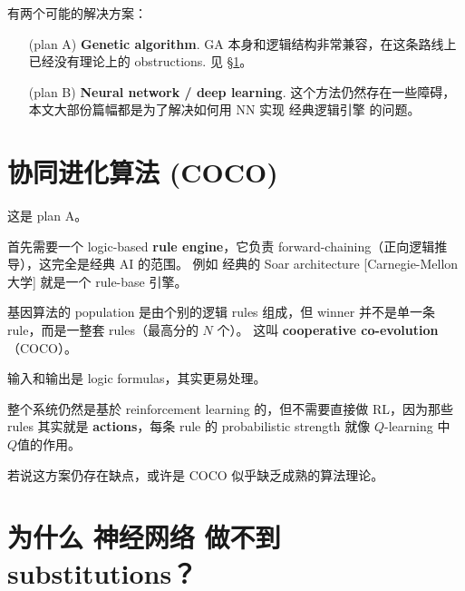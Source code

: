 \documentclass[12pt, orivec]{article}
\begin{document}
有两个可能的解决方案：
\begin{itemize}[itemindent=4em]
\item[(plan A)] \textbf{Genetic algorithm}.  GA 本身和逻辑结构非常兼容，在这条路线上已经没有理论上的 obstructions.  见 \S \ref{COCO}。\\
\item[(plan B)] \textbf{Neural network / deep learning}.  这个方法仍然存在一些障碍，本文大部份篇幅都是为了解决如何用 NN 实现 经典逻辑引擎 的问题。 
\end{itemize}

\section{协同进化算法 (COCO)}
\label{COCO}

这是 plan {\color{red} A}。


首先需要一个 logic-based \textbf{rule engine}，它负责 forward-chaining（正向逻辑推导），这完全是经典 AI 的范围。 例如 经典的 Soar architecture [Carnegie-Mellon 大学] 就是一个 rule-base 引擎。 %


基因算法的 population 是由个别的逻辑 rules 组成，但 winner 并不是单一条 rule，而是一整套 rules（最高分的 $N$ 个）。 这叫 \textbf{cooperative co-evolution}（COCO）。  

输入和输出是 logic formulas，其实更易处理。 

整个系统仍然是基於 reinforcement learning 的，但不需要直接做 RL，因为那些 rules 其实就是 \textbf{actions}，每条 rule  的 probabilistic strength 就像 $Q$-learning 中 $Q$值的作用。 

若说这方案仍存在缺点，或许是 COCO 似乎缺乏成熟的算法理论。

\section{为什么 神经网络 做不到 substitutions？}
\end{document}
